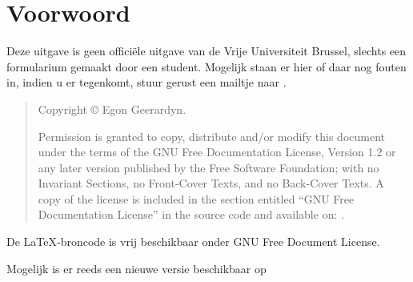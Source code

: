 \section*{Voorwoord}
\label{sec:Voorwoord}
  Deze uitgave is geen officiële uitgave van de Vrije Universiteit Brussel, slechts een formularium gemaakt door een student.
  Mogelijk staan er hier of daar nog fouten in, indien u er tegenkomt,
  stuur gerust een mailtje naar .\par

  \begin{quote}
    Copyright \copyright{}  Egon Geerardyn.\par
    Permission is granted to copy, distribute and/or modify this document
    under the terms of the GNU Free Documentation License, Version 1.2
    or any later version published by the Free Software Foundation;
    with no Invariant Sections, no Front-Cover Texts, and no Back-Cover Texts.
    A copy of the license is included in the section entitled ``GNU
    Free Documentation License'' in the source code and available on:
    .
  \end{quote}
  \noindent
  De \LaTeX -broncode is vrij beschikbaar onder GNU Free Document License. \par


  Mogelijk is er reeds een nieuwe versie beschikbaar op\par



